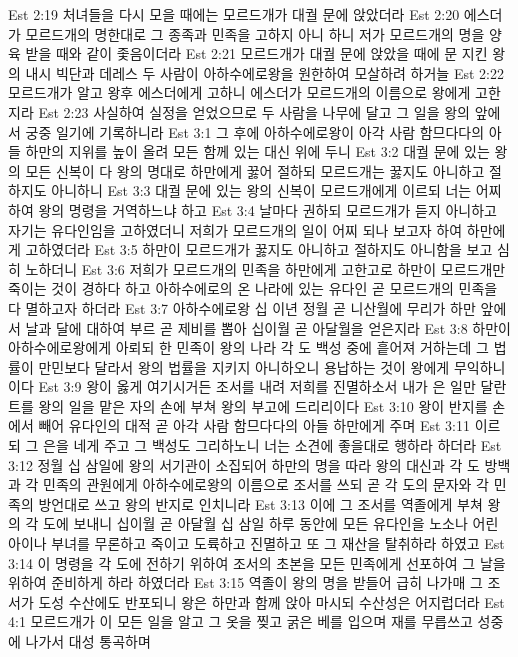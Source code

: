 Est 2:19  처녀들을 다시 모을 때에는 모르드개가 대궐 문에 앉았더라
Est 2:20  에스더가 모르드개의 명한대로 그 종족과 민족을 고하지 아니 하니 저가 모르드개의 명을 양육 받을 때와 같이 좇음이더라
Est 2:21  모르드개가 대궐 문에 앉았을 때에 문 지킨 왕의 내시 빅단과 데레스 두 사람이 아하수에로왕을 원한하여 모살하려 하거늘
Est 2:22  모르드개가 알고 왕후 에스더에게 고하니 에스더가 모르드개의 이름으로 왕에게 고한지라
Est 2:23  사실하여 실정을 얻었으므로 두 사람을 나무에 달고 그 일을 왕의 앞에서 궁중 일기에 기록하니라
Est 3:1  그 후에 아하수에로왕이 아각 사람 함므다다의 아들 하만의 지위를 높이 올려 모든 함께 있는 대신 위에 두니
Est 3:2  대궐 문에 있는 왕의 모든 신복이 다 왕의 명대로 하만에게 꿇어 절하되 모르드개는 꿇지도 아니하고 절하지도 아니하니
Est 3:3  대궐 문에 있는 왕의 신복이 모르드개에게 이르되 너는 어찌하여 왕의 명령을 거역하느냐 하고
Est 3:4  날마다 권하되 모르드개가 듣지 아니하고 자기는 유다인임을 고하였더니 저희가 모르드개의 일이 어찌 되나 보고자 하여 하만에게 고하였더라
Est 3:5  하만이 모르드개가 꿇지도 아니하고 절하지도 아니함을 보고 심히 노하더니
Est 3:6  저희가 모르드개의 민족을 하만에게 고한고로 하만이 모르드개만 죽이는 것이 경하다 하고 아하수에로의 온 나라에 있는 유다인 곧 모르드개의 민족을 다 멸하고자 하더라
Est 3:7  아하수에로왕 십 이년 정월 곧 니산월에 무리가 하만 앞에서 날과 달에 대하여 부르 곧 제비를 뽑아 십이월 곧 아달월을 얻은지라
Est 3:8  하만이 아하수에로왕에게 아뢰되 한 민족이 왕의 나라 각 도 백성 중에 흩어져 거하는데 그 법률이 만민보다 달라서 왕의 법률을 지키지 아니하오니 용납하는 것이 왕에게 무익하니이다
Est 3:9  왕이 옳게 여기시거든 조서를 내려 저희를 진멸하소서 내가 은 일만 달란트를 왕의 일을 맡은 자의 손에 부쳐 왕의 부고에 드리리이다
Est 3:10  왕이 반지를 손에서 빼어 유다인의 대적 곧 아각 사람 함므다다의 아들 하만에게 주며
Est 3:11  이르되 그 은을 네게 주고 그 백성도 그리하노니 너는 소견에 좋을대로 행하라 하더라
Est 3:12  정월 십 삼일에 왕의 서기관이 소집되어 하만의 명을 따라 왕의 대신과 각 도 방백과 각 민족의 관원에게 아하수에로왕의 이름으로 조서를 쓰되 곧 각 도의 문자와 각 민족의 방언대로 쓰고 왕의 반지로 인치니라
Est 3:13  이에 그 조서를 역졸에게 부쳐 왕의 각 도에 보내니 십이월 곧 아달월 십 삼일 하루 동안에 모든 유다인을 노소나 어린 아이나 부녀를 무론하고 죽이고 도륙하고 진멸하고 또 그 재산을 탈취하라 하였고
Est 3:14  이 명령을 각 도에 전하기 위하여 조서의 초본을 모든 민족에게 선포하여 그 날을 위하여 준비하게 하라 하였더라
Est 3:15  역졸이 왕의 명을 받들어 급히 나가매 그 조서가 도성 수산에도 반포되니 왕은 하만과 함께 앉아 마시되 수산성은 어지럽더라
Est 4:1  모르드개가 이 모든 일을 알고 그 옷을 찢고 굵은 베를 입으며 재를 무릅쓰고 성중에 나가서 대성 통곡하며

